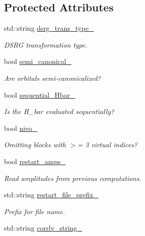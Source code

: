 \subsection*{Protected Attributes}
\begin{DoxyCompactItemize}
\item 
std\+::string \mbox{\hyperlink{classforte_1_1_m_r_d_s_r_g_a225d89c8b0470bb70ee5877892a98dbb}{dsrg\+\_\+trans\+\_\+type\+\_\+}}
\begin{DoxyCompactList}\small\item\em D\+S\+RG transformation type. \end{DoxyCompactList}\item 
bool \mbox{\hyperlink{classforte_1_1_m_r_d_s_r_g_a97f6cb5d534c406809d83fff0d3365db}{semi\+\_\+canonical\+\_\+}}
\begin{DoxyCompactList}\small\item\em Are orbitals semi-\/canonicalized? \end{DoxyCompactList}\item 
bool \mbox{\hyperlink{classforte_1_1_m_r_d_s_r_g_a10466bab289c991aca9f6f242b534039}{sequential\+\_\+\+Hbar\+\_\+}}
\begin{DoxyCompactList}\small\item\em Is the H\+\_\+bar evaluated sequentially? \end{DoxyCompactList}\item 
bool \mbox{\hyperlink{classforte_1_1_m_r_d_s_r_g_a82b9a195bbaa915b7fa695fe748202d8}{nivo\+\_\+}}
\begin{DoxyCompactList}\small\item\em Omitting blocks with $>$= 3 virtual indices? \end{DoxyCompactList}\item 
bool \mbox{\hyperlink{classforte_1_1_m_r_d_s_r_g_a86bcc5396cb8fd4ea552ea0dc90f7d34}{restart\+\_\+amps\+\_\+}}
\begin{DoxyCompactList}\small\item\em Read amplitudes from previous computations. \end{DoxyCompactList}\item 
std\+::string \mbox{\hyperlink{classforte_1_1_m_r_d_s_r_g_a7df015b9ee9e651c1b1c6f0cd463b85b}{restart\+\_\+file\+\_\+prefix\+\_\+}}
\begin{DoxyCompactList}\small\item\em Prefix for file name. \end{DoxyCompactList}\item 
std\+::string \mbox{\hyperlink{classforte_1_1_m_r_d_s_r_g_a11e1382fc9152eff43912c6888f4dfe1}{corrlv\+\_\+string\+\_\+}}

\end{DoxyCompactItemize}
